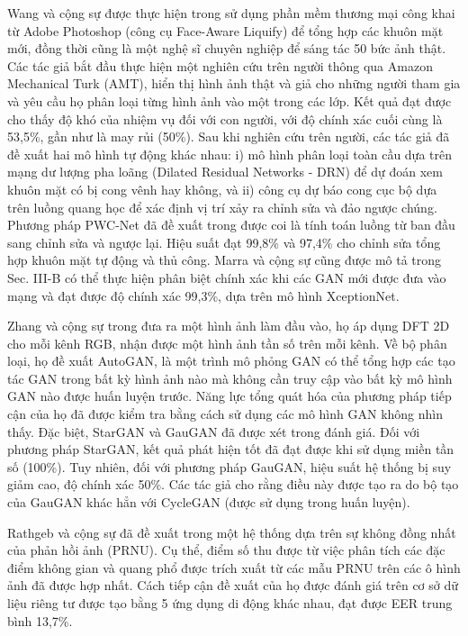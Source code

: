 \documentclass{article}
\begin{document}
Wang và cộng sự được thực hiện trong  sử dụng phần mềm thương mại công khai từ Adobe Photoshop (công cụ Face-Aware Liquify) để tổng hợp các khuôn mặt mới, đồng thời cũng là một nghệ sĩ chuyên nghiệp để sáng tác 50 bức ảnh thật. Các tác giả bắt đầu thực hiện một nghiên cứu trên người thông qua Amazon Mechanical Turk (AMT), hiển thị hình ảnh thật và giả cho những người tham gia và yêu cầu họ phân loại từng hình ảnh vào một trong các lớp. Kết quả đạt được cho thấy độ khó của nhiệm vụ đối với con người, với độ chính xác cuối cùng là 53,5\%, gần như là may rủi (50\%). Sau khi nghiên cứu trên người, các tác giả đã đề xuất hai mô hình tự động khác nhau: i) mô hình phân loại toàn cầu dựa trên mạng dư lượng pha loãng (Dilated Residual Networks - DRN) để dự đoán xem khuôn mặt có bị cong vênh hay không, và ii) công cụ dự báo cong cục bộ dựa trên luồng quang học để xác định vị trí xảy ra chỉnh sửa và đảo ngược chúng. Phương pháp PWC-Net đã đề xuất trong  được coi là tính toán luồng từ ban đầu sang chỉnh sửa và ngược lại. Hiệu suất đạt 99,8\% và 97,4\% cho chỉnh sửa tổng hợp khuôn mặt tự động và thủ công.
Marra và cộng sự cũng được mô tả trong Sec. III-B có thể thực hiện phân biệt chính xác khi các GAN mới được đưa vào mạng và đạt được độ chính xác 99,3\%, dựa trên mô hình XceptionNet.

Zhang và cộng sự trong  đưa ra một hình ảnh làm đầu vào, họ áp dụng DFT 2D cho mỗi kênh RGB, nhận được một hình ảnh tần số trên mỗi kênh. Về bộ phân loại, họ đề xuất AutoGAN, là một trình mô phỏng GAN có thể tổng hợp các tạo tác GAN trong bất kỳ hình ảnh nào mà không cần truy cập vào bất kỳ mô hình GAN nào được huấn luyện trước. Năng lực tổng quát hóa của phương pháp tiếp cận của họ đã được kiểm tra bằng cách sử dụng các mô hình GAN không nhìn thấy. Đặc biệt, StarGAN và GauGAN đã được xét trong đánh giá. Đối với phương pháp StarGAN, kết quả phát hiện tốt đã đạt được khi sử dụng miền tần số (100\%). Tuy nhiên, đối với phương pháp GauGAN, hiệu suất hệ thống bị suy giảm cao, độ chính xác 50\%. Các tác giả cho rằng điều này được tạo ra do bộ tạo của GauGAN khác hẳn với CycleGAN (được sử dụng trong huấn luyện).

Rathgeb và cộng sự đã đề xuất trong  một hệ thống dựa trên sự không đồng nhất của phản hồi ảnh (PRNU). Cụ thể, điểm số thu được từ việc phân tích các đặc điểm không gian và quang phổ được trích xuất từ các mẫu PRNU trên các ô hình ảnh đã được hợp nhất. Cách tiếp cận đề xuất của họ được đánh giá trên cơ sở dữ liệu riêng tư được tạo bằng 5 ứng dụng di động khác nhau, đạt được EER trung bình 13,7\%.
\end{document}
